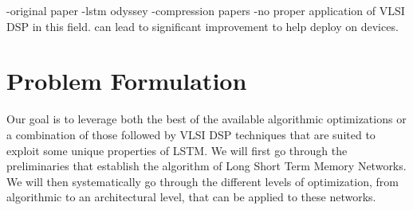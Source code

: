 -original paper
-lstm odyssey
-compression papers
-no proper application of VLSI DSP in this field. can lead to significant improvement to help deploy on devices.

\section{Problem Formulation}
Our goal is to leverage both the best of the available algorithmic optimizations or a combination of those followed by VLSI DSP techniques that are suited to exploit some unique properties of LSTM.
We will first go through the preliminaries that establish the algorithm of Long Short Term Memory Networks. We will then systematically go through the different levels of optimization, from algorithmic to an architectural level, that can be applied to these networks.
